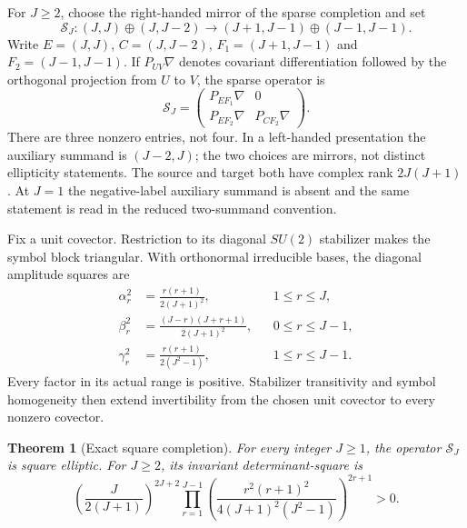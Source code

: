 \documentclass[11pt]{article}
\newtheorem{theorem}{Theorem}[section]
\theoremstyle{definition}
\begin{document}
For $J\geq2$, choose the right-handed mirror of the sparse completion and set
\[
 \mathcal S_J:
 (J,J)\oplus(J,J-2)
 \longrightarrow
 (J+1,J-1)\oplus(J-1,J-1).
\]
Write $E=(J,J)$, $C=(J,J-2)$, $F_1=(J+1,J-1)$ and $F_2=(J-1,J-1)$.
If $P_{UV}\nabla$ denotes covariant differentiation followed by the
orthogonal projection from $U$ to $V$, the sparse operator is
\[
 \mathcal S_J=
 \begin{pmatrix}P_{EF_1}\nabla&0\\P_{EF_2}\nabla&P_{CF_2}\nabla\end{pmatrix}.
\]
There are three nonzero entries, not four. In a
left-handed presentation the auxiliary summand is $(J-2,J)$; the two choices
are mirrors, not distinct ellipticity statements.  The source and target both
have complex rank $2J(J+1)$.  At $J=1$ the negative-label auxiliary summand is
absent and the same statement is read in the reduced two-summand convention.

Fix a unit covector.  Restriction to its diagonal $SU(2)$ stabilizer makes the
symbol block triangular.  With orthonormal irreducible bases, the diagonal
amplitude squares are
\begin{align}
 \alpha_r^2&=\frac{r(r+1)}{2(J+1)^2}, &&1\leq r\leq J,\\
 \beta_r^2&=\frac{(J-r)(J+r+1)}{2(J+1)^2}, &&0\leq r\leq J-1,\\
 \gamma_r^2&=\frac{r(r+1)}{2(J^2-1)}, &&1\leq r\leq J-1.
\end{align}
Every factor in its actual range is positive.  Stabilizer transitivity and
symbol homogeneity then extend invertibility from the chosen unit covector to
every nonzero covector.

\begin{theorem}[Exact square completion]
For every integer $J\geq1$, the operator $\mathcal S_J$ is square elliptic.
For $J\geq2$, its invariant determinant-square is
\[
 \left(\frac{J}{2(J+1)}\right)^{2J+2}
 \prod_{r=1}^{J-1}
 \left(
  \frac{r^2(r+1)^2}{4(J+1)^2(J^2-1)}
 \right)^{2r+1}>0.
\]
\end{theorem}
\end{document}
